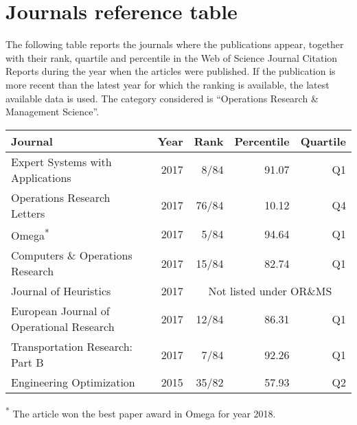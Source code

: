 \section*{Journals reference table}

The following table reports the journals where the publications appear, together with their rank, quartile and percentile in the Web of Science Journal Citation Reports during the year when the articles were published.
If the publication is more recent than the latest year for which the ranking is available, the latest available data is used.
The category considered is ``Operations Research \& Management Science''.

\begin{center}
    \vspace{.5em}
    \begin{tabular}{lrrrr}
        {\bfseries Journal} & {\bfseries Year} & {\bfseries Rank} & {\bfseries Percentile} & {\bfseries Quartile} \\
        \hline
        Expert Systems with Applications & 2017 & 8/84 & 91.07 & Q1 \\
        Operations Research Letters & 2017 & 76/84 & 10.12 & Q4 \\
        Omega\textsuperscript{*} & 2017 & 5/84 & 94.64 & Q1 \\
        Computers \& Operations Research & 2017 & 15/84 & 82.74 & Q1 \\
        Journal of Heuristics & 2017 & \multicolumn{3}{c}{Not listed under OR\&MS} \\
        European Journal of Operational Research & 2017 & 12/84 & 86.31 & Q1 \\
        Transportation Research: Part B & 2017 & 7/84 & 92.26 & Q1 \\
        Engineering Optimization & 2015 & 35/82 & 57.93 & Q2 \\
    \end{tabular}
    \vspace{.5em}
    \scriptsize{\textsuperscript{*} The article won the best paper award in Omega for year 2018.}
\end{center}